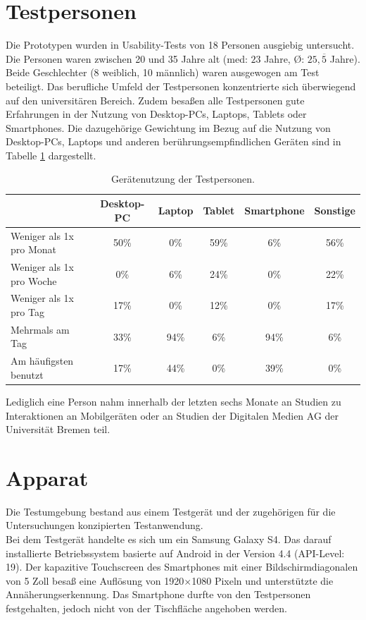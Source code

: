 \documentclass[a4paper,12pt,bibliography=totoc]{scrreprt}%
\begin{document}
\section{Testpersonen}
Die Prototypen wurden in Usability-Tests von 18 Personen ausgiebig untersucht. Die Personen waren zwischen 20 und 35 Jahre alt (med: $23$ Jahre, \O: $25{,}\overline 5$ Jahre). Beide Geschlechter (8 weiblich, 10 männlich) waren ausgewogen am Test beteiligt. Das berufliche Umfeld der Testpersonen konzentrierte sich überwiegend auf den universitären Bereich. Zudem besaßen alle Testpersonen gute Erfahrungen in der Nutzung von Desktop-PCs, Laptops, Tablets oder Smartphones. Die dazugehörige Gewichtung im Bezug auf die Nutzung von Desktop-PCs, Laptops und anderen berührungsempfindlichen Geräten sind in Tabelle \ref{nutzungtestpersonen} dargestellt.
\begin{table}
\centering
\renewcommand{\arraystretch}{2}
\setlength{\tabcolsep}{4pt}
\begin{tabular}{ p{4.8cm} | c c c c c}
& Desktop-PC & Laptop & Tablet & Smartphone & Sonstige\\\hline
Weniger als 1x pro Monat & 50\% & 0\% & 59\% & 6\% & 56\%\\
Weniger als 1x pro Woche & 0\% & 6\% & 24\% & 0\% & 22\% \\
Weniger als 1x pro Tag & 17\% & 0\% & 12\% & 0\% & 17\% \\
Mehrmals am Tag & 33\% & 94\% & 6\% & 94\% & 6\% \\
\hline
Am häufigsten benutzt & 17\% & 44\% & 0\% & 39\% & 0\% \\
\end{tabular}
\caption{Gerätenutzung der Testpersonen.}
\label{nutzungtestpersonen}
\end{table}
Lediglich eine Person nahm innerhalb der letzten sechs Monate an Studien zu Interaktionen an Mobilgeräten oder an Studien der Digitalen Medien AG der Universität Bremen teil.

\section{Apparat}
Die Testumgebung bestand aus einem Testgerät und der zugehörigen für die Untersuchungen konzipierten Testanwendung.\\
Bei dem Testgerät handelte es sich um ein Samsung Galaxy S4. Das darauf installierte Betriebssystem basierte auf Android in der Version 4.4 (API-Level: 19). Der kapazitive Touchscreen des Smartphones mit einer Bildschirmdiagonalen von 5 Zoll besaß eine Auflösung von 1920$\times$1080 Pixeln und unterstützte die Annäherungserkennung. Das Smartphone durfte von den Testpersonen festgehalten, jedoch nicht von der Tischfläche angehoben werden.
\end{document}

